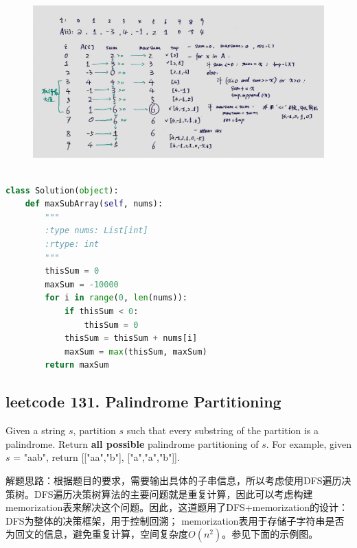 \documentclass[a4paper,10pt]{article}
\begin{document}
\begin{figure}[h]
    \includegraphics[width=1\textwidth]{leetcode53.jpg}
    \centering\\
\end{figure}

\begin{lstlisting}[language=Python, caption=Problem53. Maximum Subarray]

class Solution(object):
    def maxSubArray(self, nums):
        """
        :type nums: List[int]
        :rtype: int
        """
        thisSum = 0
        maxSum = -10000
        for i in range(0, len(nums)):
            if thisSum < 0: 
                thisSum = 0
            thisSum = thisSum + nums[i]
            maxSum = max(thisSum, maxSum)
        return maxSum
\end{lstlisting}


\subsection{leetcode 131. Palindrome Partitioning}
Given a string $s$, partition $s$ such that every substring of the partition is a palindrome. Return \textbf{all possible} palindrome partitioning of $s$. For example, given $s$ = "aab", return [["aa","b"], ["a","a","b"]]. \\

\begin{CJK*}{UTF8}{gbsn}
\noindent 解题思路：根据题目的要求，需要输出具体的子串信息，所以考虑使用DFS遍历决策树。DFS遍历决策树算法的主要问题就是重复计算，因此可以考虑构建memorization表来解决这个问题。因此，这道题用了DFS+memorization的设计：DFS为整体的决策框架，用于控制回溯； memorization表用于存储子字符串是否为回文的信息，避免重复计算，空间复杂度$O(n^2)$。参见下面的示例图。
\end{CJK*}\\
\end{document}
